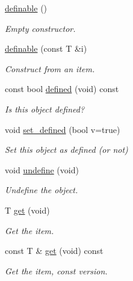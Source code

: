 \begin{DoxyCompactItemize}
\item 
\hyperlink{class_photo_finish_1_1definable_ac1efd98687fba9bb936b66fc050fedc1}{definable} ()
\begin{DoxyCompactList}\small\item\em Empty constructor. \end{DoxyCompactList}\item 
\hyperlink{class_photo_finish_1_1definable_ac101abb7feaf8b5c6477c4f396ed7240}{definable} (const T \&i)
\begin{DoxyCompactList}\small\item\em Construct from an item. \end{DoxyCompactList}\item 
const bool \hyperlink{class_photo_finish_1_1definable_a16e04c8c780e3f7cc669a9877ea2d0b2}{defined} (void) const
\begin{DoxyCompactList}\small\item\em Is this object defined? \end{DoxyCompactList}\item 
void \hyperlink{class_photo_finish_1_1definable_a0a5c7b94bc7298e26557fe0fe084f730}{set\+\_\+defined} (bool v=true)
\begin{DoxyCompactList}\small\item\em Set this object as \textquotesingle{}defined\textquotesingle{} (or not) \end{DoxyCompactList}\item 
void \hyperlink{class_photo_finish_1_1definable_ab8b9336f1125a05efaa698f1faad0b89}{undefine} (void)
\begin{DoxyCompactList}\small\item\em Undefine the object. \end{DoxyCompactList}\item 
T \hyperlink{class_photo_finish_1_1definable_aafa6cc5bd59798b25e845c62600b50d6}{get} (void)
\begin{DoxyCompactList}\small\item\em Get the item. \end{DoxyCompactList}\item 
const T \& \hyperlink{class_photo_finish_1_1definable_a615dcc122a5af98b130316856d3531ea}{get} (void) const
\begin{DoxyCompactList}\small\item\em Get the item, const version. \end{DoxyCompactList}\item 

\end{DoxyCompactItemize}
